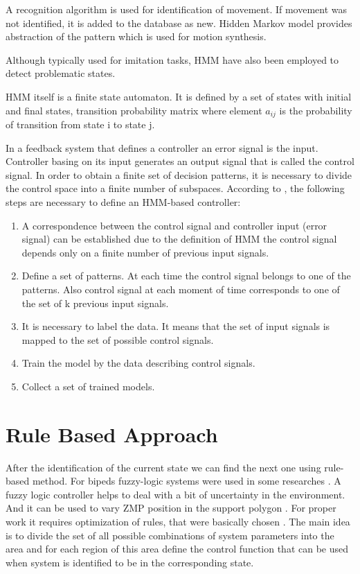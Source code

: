 \documentclass[12pt,a4paper]{report}
\begin{document}
			A recognition algorithm is used for identification of movement. If movement was not identified, it is added to the database as new. Hidden Markov model provides abstraction of the pattern which is used for motion synthesis.
			
			Although typically used for imitation tasks, HMM have also been employed to detect problematic states.
			
			HMM itself is a finite state automaton. It is defined by a set of states with initial and final states, transition probability matrix where element $a_{ij}$ is the probability of transition from state i to state j.
			
			In a feedback system that defines a controller an error signal is the input. Controller basing on its input generates an output signal that is called the control signal. In order to obtain a finite set of decision patterns, it is necessary to divide the control space into a finite number of subspaces. According to  \cite{yang1994hidden}, the following steps are necessary to define an HMM-based controller:
			
			\begin{enumerate}
				\item
					A correspondence  between the control signal and controller input (error signal) can be established due to the definition of HMM the control signal depends only on a finite number of previous input signals.
				\item 
					Define a set of patterns. At each time the control signal belongs to one of the patterns. Also control signal at each moment of time corresponds to one of the set of k previous input signals.
				\item
					It is necessary to label the data. It means that the set of input signals is mapped to the set of possible control signals.
				\item
					Train the model by the data describing control signals.
				\item
					Collect a set of trained models.
			\end{enumerate} 
			
		\section{Rule Based Approach}
			After the identification of the current state we can find the next one using rule-based method. For bipeds fuzzy-logic systems were used in some researches \cite{park2003fuzzy}.  A fuzzy logic controller helps to deal with a bit of uncertainty in the environment. And it can be used to vary ZMP position in the support polygon \cite{park2003fuzzy}. For proper work it requires optimization of rules, that were basically chosen \cite{vundavilli2010dynamically}.
			The main idea is to divide the set of all possible combinations of system parameters into the area and for each region of this area define the control function that can be used when system is identified to be in the corresponding state.
		
\end{document}
